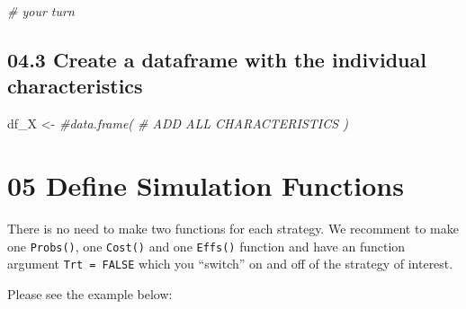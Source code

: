 \documentclass[
]{article}
\newenvironment{Shaded}{\begin{snugshade}}{\end{snugshade}}
\newcommand{\CommentTok}[1]{\textcolor[rgb]{0.56,0.35,0.01}{\textit{#1}}}
\newcommand{\NormalTok}[1]{#1}
\newcommand{\StringTok}[1]{\textcolor[rgb]{0.31,0.60,0.02}{#1}}
\begin{document}
\begin{Shaded}
\begin{Highlighting}[]
\CommentTok{# your turn}
\end{Highlighting}
\end{Shaded}

\hypertarget{create-a-dataframe-with-the-individual-characteristics}{%
\subsection{04.3 Create a dataframe with the individual
characteristics}\label{create-a-dataframe-with-the-individual-characteristics}}

\begin{Shaded}
\begin{Highlighting}[]
\NormalTok{df_X    <-}\StringTok{ }\CommentTok{#data.frame( # ADD ALL CHARACTERISTICS ) }
\end{Highlighting}
\end{Shaded}

\hypertarget{define-simulation-functions}{%
\section{05 Define Simulation
Functions}\label{define-simulation-functions}}

There is no need to make two functions for each strategy. We recomment
to make one \texttt{Probs()}, one \texttt{Cost()} and one
\texttt{Effs()} function and have an function argument
\texttt{Trt\ =\ FALSE} which you ``switch'' on and off of the strategy
of interest.

Please see the example below:
\end{document}
